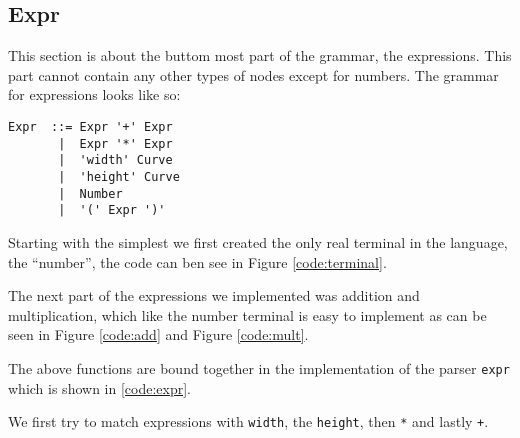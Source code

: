 \subsection{Expr}

This section is about the buttom most part of the grammar, the expressions. This
part cannot contain any other types of nodes except for numbers. The grammar for
expressions looks like so:
\begin{verbatim}
Expr  ::= Expr '+' Expr
       |  Expr '*' Expr
       |  'width' Curve
       |  'height' Curve
       |  Number
       |  '(' Expr ')'
\end{verbatim}

Starting with the simplest we first created the only real terminal in the
language, the ``number'', the code can ben see in Figure \ref{code:terminal}.


The next part of the expressions we implemented was addition and multiplication,
which like the number terminal is easy to implement as can be seen in Figure
\ref{code:add} and Figure \ref{code:mult}.


The above functions are bound together in the implementation of the parser
\texttt{expr} which is shown in \ref{code:expr}.


We first try to match expressions with \texttt{width}, the \texttt{height}, then
\texttt{*} and lastly \texttt{+}.
